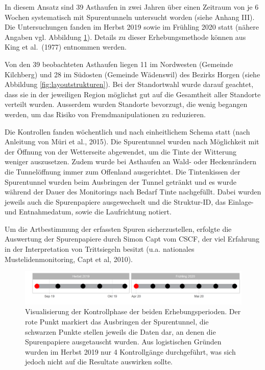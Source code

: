 \documentclass[
]{scrbook}
\begin{document}
In diesem Ansatz sind 39 Asthaufen in zwei Jahren über einen Zeitraum von je 6 Wochen systematisch mit Spurentunneln untersucht worden (siehe Anhang III). Die Untersuchungen fanden im Herbst 2019 sowie im Frühling 2020 statt (nähere Angaben vgl. Abbildung \ref{fig:erhebungswoche}). Details zu dieser Erhebungsmethode können aus King et al.~(1977) entnommen werden.

Von den 39 beobachteten Asthaufen liegen 11 im Nordwesten (Gemeinde Kilchberg) und 28 im Südosten (Gemeinde Wädenswil) des Bezirks Horgen (siehe Abbildung \ref{fig:layoutstrukturen}). Bei der Standortwahl wurde darauf geachtet, dass sie in der jeweiligen Region möglichst gut auf die Gesamtheit aller Standorte verteilt wurden. Ausserdem wurden Standorte bevorzugt, die wenig begangen werden, um das Risiko von Fremdmanipulationen zu reduzieren.

Die Kontrollen fanden wöchentlich und nach einheitlichem Schema statt (nach Anleitung von Müri et al., 2015). Die Spurentunnel wurden nach Möglichkeit mit der Öffnung von der Wetterseite abgewendet, um die Tinte der Witterung weniger auszusetzen. Zudem wurde bei Asthaufen an Wald- oder Heckenrändern die Tunnelöffnung immer zum Offenland ausgerichtet. Die Tintenkissen der Spurentunnel wurden beim Ausbringen der Tunnel getränkt und es wurde während der Dauer des Monitorings nach Bedarf Tinte nachgefüllt. Dabei wurden jeweils auch die Spurenpapiere ausgewechselt und die Struktur-ID, das Einlage- und Entnahmedatum, sowie die Laufrichtung notiert.

Um die Artbestimmung der erfassten Spuren sicherzustellen, erfolgte die Auswertung der Spurenpapiere durch Simon Capt vom CSCF, der viel Erfahrung in der Interpretation von Trittsiegeln besitzt (u.a. nationales Mustelidenmonitoring, Capt et al, 2010).



\begin{figure}
\includegraphics[width=1\linewidth]{images/Erhebungswochen} \caption{Visualisierung der Kontrollphase der beiden Erhebungsperioden. Der rote Punkt markiert das Ausbringen der Spurentunnel, die schwarzen Punkte stellen jeweils die Daten dar, an denen die Spurenpapiere ausgetauscht wurden. Aus logistischen Gründen wurden im Herbst 2019 nur 4 Kontrollgänge durchgeführt, was sich jedoch nicht auf die Resultate auswirken sollte.}\label{fig:erhebungswoche}
\end{figure}
\end{document}
